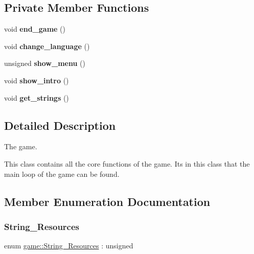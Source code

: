 \subsection*{Private Member Functions}
\begin{DoxyCompactItemize}
\item 
\mbox{\label{classgame_a239e8422b8b98eab25bc210f229458f8}} 
void {\bfseries end\+\_\+game} ()
\item 
\mbox{\label{classgame_ab1024c2d2a3eac9734519285ff337a5f}} 
void {\bfseries change\+\_\+language} ()
\item 
\mbox{\label{classgame_a8ff791657d7ac0576c4f91f12238ae44}} 
unsigned {\bfseries show\+\_\+menu} ()
\item 
\mbox{\label{classgame_aaf9658ba37ce904423fa94b6d4a3104e}} 
void {\bfseries show\+\_\+intro} ()
\item 
\mbox{\label{classgame_a75d8297f6bcfe62c86653174d36cad9b}} 
void {\bfseries get\+\_\+strings} ()
\end{DoxyCompactItemize}


\subsection{Detailed Description}
The game. 

This class contains all the core functions of the game. It\textquotesingle{}s in this class that the main loop of the game can be found. 

\subsection{Member Enumeration Documentation}
\mbox{\label{classgame_a750823afdadfbde9c945b9d0703c499d}} 
\subsubsection{\texorpdfstring{String\_Resources}{String\_Resources}}
{\footnotesize\ttfamily enum \mbox{\hyperlink{classgame_a750823afdadfbde9c945b9d0703c499d}{game\+::\+String\+\_\+\+Resources}} \+: unsigned\hspace{0.3cm}{\ttfamily [protected]}}



